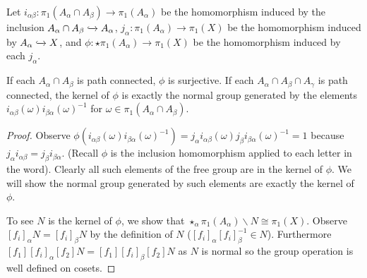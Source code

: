 \documentclass[10pt]{article}
\begin{document}
\begin{theorem}

	Let $i_{\alpha\beta}: \pi_1(A_{\alpha} \cap A_{\beta}) \to \pi_1(A_{\alpha})$
	be the homomorphism induced by the inclusion $A_{\alpha} \cap A_{\beta}
	\xhookrightarrow{} A_{\alpha}$, $j_{\alpha}: \pi_1(A_{\alpha}) \to \pi_1(X)$
	be the homomorphism induced by $A_{\alpha} \xhookrightarrow{} X$, and $\phi:
	\star \pi_1(A_{\alpha}) \to \pi_1(X)$ be the homomorphism induced by each
	$j_{\alpha}$.

	If each $A_{\alpha} \cap A_{\beta}$ is path connected, $\phi$ is surjective.
	If each $A_{\alpha} \cap A_{\beta} \cap A_{\gamma}$ is path connected, the
	kernel of $\phi$ is exactly the normal group generated by the elements
	$i_{\alpha\beta}(\omega)i_{\beta\alpha}(\omega)^{-1}$ for $\omega \in
	\pi_1(A_{\alpha}\cap A_{\beta})$.
\end{theorem}

\begin{proof}

	Observe $\phi(i_{\alpha\beta}(\omega)i_{\beta\alpha}(\omega)^{-1}) = j_{\alpha}i_{\alpha\beta}(\omega)j_{\beta}i_{\beta\alpha}(\omega)^{-1} = 1$ because $j_{\alpha}i_{\alpha\beta} = j_{\beta}i_{\beta\alpha}$. (Recall $\phi$ is the inclusion homomorphism applied to each letter in the word). Clearly all such elements of the free group are in the kernel of $\phi$. We will show the normal group generated by such elements are exactly the kernel of $\phi$.

	To see $N$ is the kernel of $\phi$, we show that $\star_{\alpha} \pi_1(A_{\alpha}) \backslash N \cong \pi_1(X)$.
	Observe $[f_i]_{\alpha}N = [f_i]_{\beta}N$ by the definition of $N$ ($[f_i]_{\alpha}[f_i]_{\beta}^{-1} \in N$). Furthermore $[f_1][f_i]_{\alpha}[f_2]N = [f_1][f_i]_{\beta}[f_2]N$ as $N$ is normal so the group operation is well defined on cosets.

\end{proof}
\end{document}
